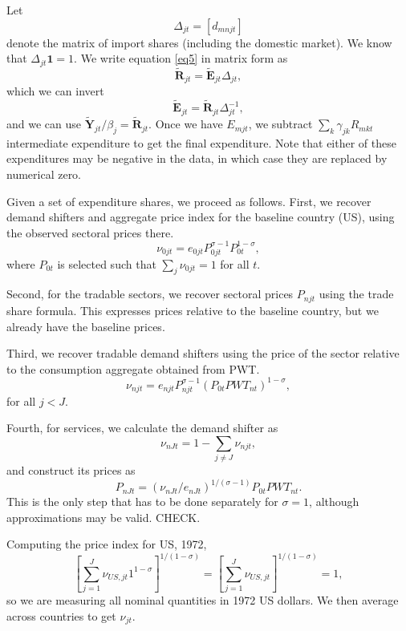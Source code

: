 \documentclass[12pt]{article}
\begin{document}
Let
\[
\Delta_{jt} = [d_{mnjt}] 
\]
denote the matrix of import shares (including the domestic market). We know that $\Delta_{jt}\mathbf 1=1$. We write equation \eqref{eq5} in matrix form as
\begin{equation}
	\tilde {\mathbf R}_{jt} = \tilde {\mathbf E}_{jt}\Delta_{jt},
\end{equation}
which we can invert
\begin{equation}
	\tilde {\mathbf E}_{jt} = \tilde {\mathbf R}_{jt}\Delta_{jt}^{-1},
	\end{equation}
and we can use $\tilde {\mathbf Y}_{jt}/\beta_j = \tilde{\mathbf R}_{jt}$. Once we have $E_{mjt}$, we subtract $\sum_k\gamma_{jk}R_{mkt}$ intermediate expenditure to get the final expenditure. Note that either of these expenditures may be negative in the data, in which case they are replaced by numerical zero.

Given a set of expenditure shares, we proceed as follows. First, we recover demand shifters and aggregate price index for the baseline country (US), using the observed sectoral prices there.
\[
\nu_{0jt} = e_{0jt} P_{0jt}^{\sigma-1} P_{0t}^{1-\sigma},
\]
where $P_{0t}$ is selected such that $\sum_j \nu_{0jt}=1$ for all $t$.

Second, for the tradable sectors, we recover sectoral prices $P_{njt}$ using the trade share formula. This expresses prices relative to the baseline country, but we already have the baseline prices.

Third, we recover tradable demand shifters using the price of the sector relative to the consumption aggregate obtained from PWT.
\[
\nu_{njt} = e_{njt} P_{njt}^{\sigma-1} (P_{0t}PWT_{nt})^{1-\sigma},
\]
for all $j<J$.

Fourth, for services, we calculate the demand shifter as 
\[
\nu_{nJt} = 1-\sum_{j\neq J}\nu_{njt},
\]
and construct its prices as
\[
P_{nJt} = (\nu_{nJt}/e_{nJt})^{1/(\sigma-1)} P_{0t}PWT_{nt}.
\]
This is the only step that has to be done separately for $\sigma=1$, although approximations may be valid. CHECK.

Computing the price index for US, 1972,
\begin{equation}
	\left[\sum_{j=1}^J \nu_{US,jt} 1^{1-\sigma}\right]^{1/(1-\sigma)} = 
	\left[\sum_{j=1}^J \nu_{US,jt}\right]^{1/(1-\sigma)}
 =1,
\end{equation}
so we are measuring all nominal quantities in 1972 US dollars. We then average across countries to get $\nu_{jt}$.
\end{document}
